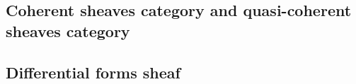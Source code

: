 \subsection{Coherent sheaves category and quasi-coherent sheaves category}
	
\subsection{Differential forms sheaf}
	
